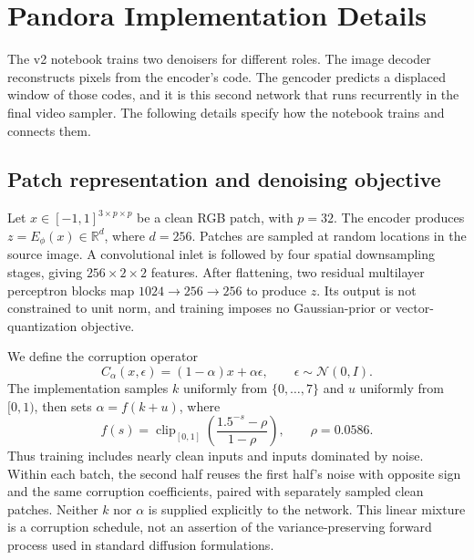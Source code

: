 \section{Pandora Implementation Details}
\label{sec:implementation}

The v2 notebook trains two denoisers for different roles. The image decoder reconstructs pixels from the encoder's code. The gencoder predicts a displaced window of those codes, and it is this second network that runs recurrently in the final video sampler. The following details specify how the notebook trains and connects them.

\subsection{Patch representation and denoising objective}

Let $x\in[-1,1]^{3\times p\times p}$ be a clean RGB patch, with $p=32$. The encoder produces $z=E_\phi(x)\in\mathbb{R}^{d}$, where $d=256$. Patches are sampled at random locations in the source image. A convolutional inlet is followed by four spatial downsampling stages, giving $256\times2\times2$ features. After flattening, two residual multilayer perceptron blocks map $1024\to256\to256$ to produce $z$. Its output is not constrained to unit norm, and training imposes no Gaussian-prior or vector-quantization objective.

We define the corruption operator
\begin{equation}
  C_\alpha(x,\epsilon)=(1-\alpha)x+\alpha\epsilon,
  \qquad \epsilon\sim\mathcal{N}(0,I).
  \label{eq:regae-corruption}
\end{equation}
The implementation samples $k$ uniformly from $\{0,\ldots,7\}$ and $u$ uniformly from $[0,1)$, then sets $\alpha=f(k+u)$, where
\begin{equation}
  f(s)=\operatorname{clip}_{[0,1]}
  \left(\frac{1.5^{-s}-\rho}{1-\rho}\right),
  \qquad \rho=0.0586.
  \label{eq:regae-noise-schedule}
\end{equation}
Thus training includes nearly clean inputs and inputs dominated by noise. Within each batch, the second half reuses the first half's noise with opposite sign and the same corruption coefficients, paired with separately sampled clean patches. Neither $k$ nor $\alpha$ is supplied explicitly to the network. This linear mixture is a corruption schedule, not an assertion of the variance-preserving forward process used in standard diffusion formulations.

